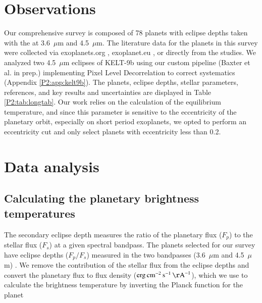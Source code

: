 
\section{Observations}
\label{P2:sec:obs}

Our comprehensive survey is composed of 78 planets with eclipse depths taken with the \spitzerIRAC at 3.6~$\mu$m and 4.5~$\mu$m.
The literature data for the planets in this survey were collected via exoplanets.org \citep{Han2014}, exoplanet.eu \citep{Schneider2011}, or directly from the studies. We analyzed two 4.5~$\mu$m eclipses of KELT-9b \citep{Mansfield2020} using our custom pipeline (Baxter et al. in prep.) implementing Pixel Level Decorrelation to correct systematics \citep{Deming2015} (Appendix \ref{P2:app:kelt9b}). The planets, eclipse depths, stellar parameters, references, and key results and uncertainties are displayed in Table \ref{P2:tab:longtab}.
Our work relies on the calculation of the equilibrium temperature, and since this parameter is sensitive to the eccentricity of the planetary orbit, especially on short period exoplanets, we  opted to perform an eccentricity cut and only select planets with eccentricity less than 0.2.


\section{Data analysis}
\label{P2:sec:data}

\subsection{Calculating the planetary brightness temperatures}
\label{P2:app:Tbcalc}

The secondary eclipse depth measures the ratio of the planetary flux ($F_p$) to the stellar flux ($F_s$) at a given spectral bandpass. The planets selected for our survey have eclipse depths ($F_p/F_s$) measured in the two \spitzerIRAC bandpasses (3.6~$\mu$m and 4.5~$\mu$m) \citep{Werner2004}. We remove the contribution of the stellar flux from the eclipse depths and convert the planetary flux to flux density ($\si{erg.cm^{-2}.s^{-1}.\AA^{-1}}$), which we use to calculate the brightness temperature by inverting the Planck function for the planet

